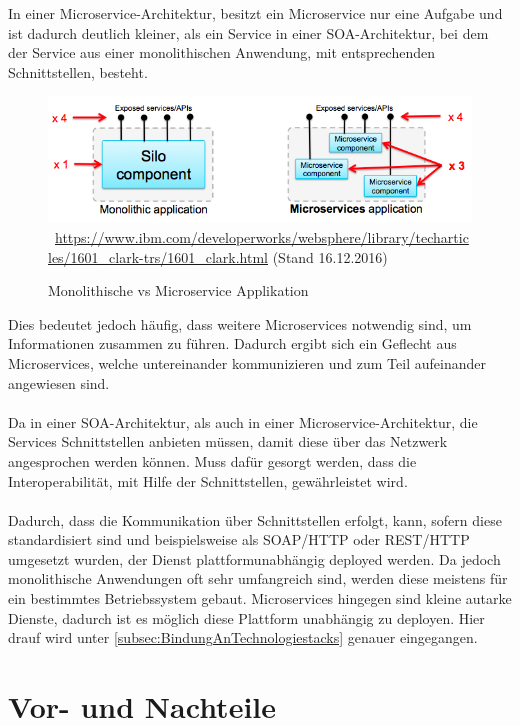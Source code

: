 In einer Microservice-Architektur, besitzt ein Microservice nur eine Aufgabe und ist dadurch deutlich kleiner, als ein Service in einer SOA-Architektur, bei dem der Service aus einer monolithischen Anwendung, mit entsprechenden Schnittstellen, besteht.
\begin{figure}[htb]
    \centering 
    \includegraphics[width=\linewidth]{content/images/MonolithicVsMicroservice}\
    \quelle\url{https://www.ibm.com/developerworks/websphere/library/techarticles/1601_clark-trs/1601_clark.html} (Stand 16.12.2016)
    \caption{Monolithische vs Microservice Applikation}
    \label{fig:MonolithicVsMicroservice} 
\end{figure}
\newpage
Dies bedeutet jedoch häufig, dass weitere Microservices notwendig sind, um Informationen zusammen zu führen. Dadurch ergibt sich ein Geflecht aus Microservices, welche untereinander kommunizieren und zum Teil aufeinander angewiesen sind.
\\\\
Da in einer SOA-Architektur, als auch in einer Microservice-Architektur, die Services Schnittstellen anbieten müssen, damit diese über das Netzwerk angesprochen werden können. Muss dafür gesorgt werden, dass die Interoperabilität, mit Hilfe der Schnittstellen, gewährleistet wird.
\\\\
Dadurch, dass die Kommunikation über Schnittstellen erfolgt, kann, sofern diese standardisiert sind und beispielsweise als SOAP/HTTP oder REST/HTTP umgesetzt wurden, der Dienst plattformunabhängig deployed werden. Da jedoch monolithische Anwendungen oft sehr umfangreich sind, werden diese meistens für ein bestimmtes Betriebssystem gebaut. Microservices hingegen sind kleine autarke Dienste, dadurch ist es möglich diese Plattform unabhängig zu deployen. Hier drauf wird unter \ref{subsec:BindungAnTechnologiestacks}  genauer eingegangen.

\section{Vor- und Nachteile}
\label{sec:VorUndNachteile}

